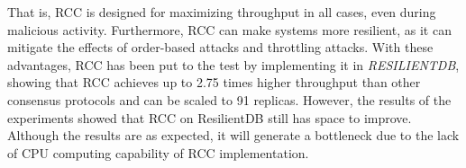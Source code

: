 \par That is, RCC is designed for maximizing throughput in all cases, even during malicious activity. 
Furthermore, RCC can make systems more resilient, as it can mitigate the effects of order-based attacks 
and throttling attacks.
With these advantages, RCC has been put to the test by implementing it in \textit{RESILIENTDB}, 
showing that RCC achieves up to 2.75 times higher throughput than other consensus protocols and 
can be scaled to 91 replicas. However, the results of the experiments showed that RCC on ResilientDB 
still has space to improve. Although the results are as expected, it will generate a bottleneck due 
to the lack of CPU computing capability of RCC implementation. 